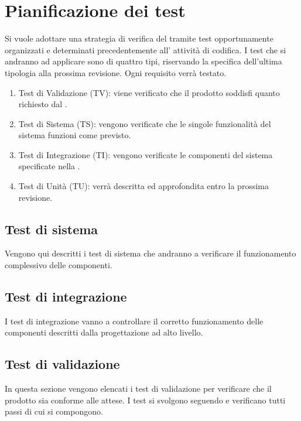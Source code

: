 \pagebreak
\section{Pianificazione dei test}
Si vuole adottare una strategia di verifica del  tramite test opportunamente organizzati e determinati precedentemente all' attività di codifica. I test che si andranno ad applicare sono di quattro tipi, riservando la specifica dell'ultima tipologia alla prossima revisione. Ogni requisito verrà testato.

\begin{enumerate}
	\item Test di Validazione (TV): viene verificato che il prodotto soddisfi quanto richiesto dal .
	\item Test di Sistema (TS): vengono verificate che le singole funzionalità del sistema funzioni come previsto.
	\item Test di Integrazione (TI): vengono verificate le componenti del sistema specificate nella \SpecificaTecnica{}.
	\item Test di Unità (TU): verrà descritta ed approfondita entro la prossima revisione.
\end{enumerate}

	
	\subsection{Test di sistema}
	Vengono qui descritti i test di sistema che andranno a verificare il funzionamento complessivo delle componenti.
	
	
	\subsection{Test di integrazione}
	I test di integrazione vanno a controllare il corretto funzionamento delle componenti descritti dalla progettazione ad alto livello. 
	

	\subsection{Test di validazione}
	In questa sezione vengono elencati i test di validazione per verificare che il prodotto sia conforme alle attese. I test si svolgono seguendo e verificano tutti passi di cui si compongono. 
	
	
	
	
	
